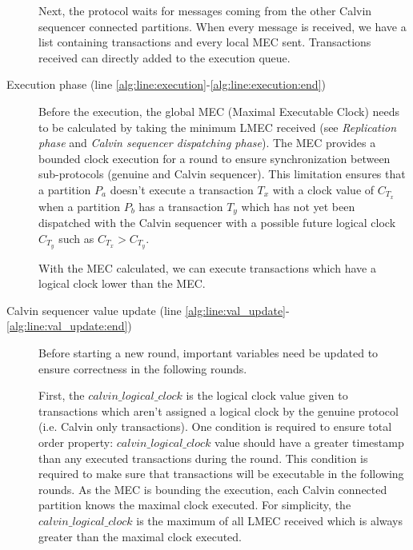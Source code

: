 \documentclass[a4paper, 10pt]{article}
\newcommand{\PE}{Calvin}
\begin{document}
\begin{description}
        Next, the protocol waits for messages coming from the other Calvin sequencer connected partitions.
        When every message is received, we have a list containing transactions and every local MEC sent.
        Transactions received can directly added to the execution queue.

    \item[Execution phase (line \ref{alg:line:execution}-\ref{alg:line:execution:end})]
        Before the execution, the global MEC (Maximal Executable Clock) needs to
        be calculated by taking the minimum LMEC received (see
        \textit{Replication phase} and \textit{Calvin sequencer dispatching phase}). The MEC provides a
        bounded clock execution for a round to ensure synchronization between sub-protocols (genuine and Calvin sequencer).
        This limitation ensures that a partition $P_a$ doesn't
        execute a transaction $T_x$ with a clock value of $C_{T_x}$ when a partition $P_b$ has a
        transaction $T_y$ which has not yet been dispatched with the Calvin sequencer with a
        possible future logical clock $C_{T_y}$ such as $C_{T_x} > C_{T_y}$.

        With the MEC calculated, we can execute transactions which have a logical clock lower than the MEC.

    \item[Calvin sequencer value update (line \ref{alg:line:val_update}-\ref{alg:line:val_update:end})]
        Before starting a new round, important variables need be updated
        to ensure correctness in the following rounds.

        First, the $calvin\_logical\_clock$ is the logical clock value given to transactions which aren't assigned a
        logical clock by the genuine protocol (i.e. Calvin only transactions). One condition is
        required to ensure total order property: $calvin\_logical\_clock$ value should have a
        greater timestamp than any executed transactions during the round. This condition is
        required to make sure that transactions will be executable in the following rounds.
        As the MEC is bounding the execution, each \PE{} connected partition knows the
        maximal clock executed. For simplicity, the $calvin\_logical\_clock$ is the maximum of
        all LMEC received which is always greater than the maximal clock executed.



\end{description}
\end{document}
